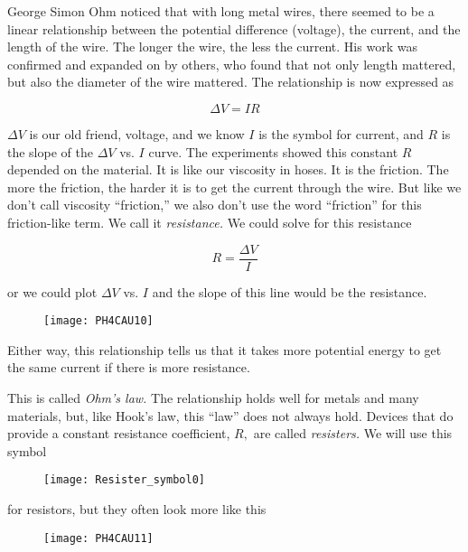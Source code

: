 George Simon Ohm noticed that with long metal wires, there seemed to be a linear relationship between the potential difference (voltage), the current, and the length of the wire. The longer the wire, the less the current. His work was confirmed and expanded on by others, who found that not only length mattered, but also the diameter of the wire mattered. The relationship is now expressed as

\begin{equation*}
	\Delta V=IR
\end{equation*}

$\Delta V$ is our old friend, voltage, and we know $I$ is the symbol for current, and $R$ is the slope of the $\Delta V$ vs. $I$ curve. The experiments showed this constant $R$ depended on the material. It is like our viscosity in hoses. It is the friction. The more the friction, the harder it is to get the current through the wire. But like we don't call viscosity ``friction,'' we also don't use the word ``friction'' for this friction-like term. We call it \emph{resistance.} We could solve for this resistance 

\begin{equation*}
	R=\frac{\Delta V}{I}
\end{equation*}

or we could plot $\Delta V$ vs. $I$ and the slope of this line would be the resistance.

\begin{figure}[h!]
	\centering
	\texttt{[image: PH4CAU10]}
\end{figure}

Either way, this relationship tells us that it takes more potential energy to get the same current if there is more resistance.

This is called \emph{Ohm's law.} The relationship holds well for metals and many materials, but, like Hook's law, this ``law'' does not always hold. Devices that do provide a constant resistance coefficient, $R,$ are called \emph{resisters.} We will use this symbol

\begin{figure}[h!]
	\centering
    \texttt{[image: Resister\_symbol0]}
\end{figure}

for resistors, but they often look more like this

\begin{figure}[h!]
	\centering
    \texttt{[image: PH4CAU11]}
\end{figure}

